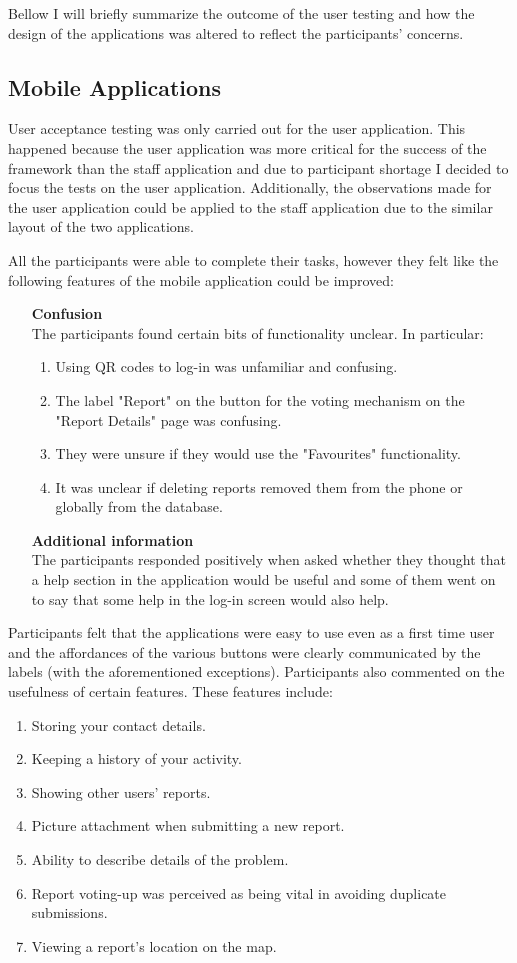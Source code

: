 \documentclass[12pt]{ecsproject}     %
\begin{document}
Bellow I will briefly summarize the outcome of the user testing and how the design of the applications was altered to reflect the participants' concerns.

\subsection{Mobile Applications}
User acceptance testing was only carried out for the user application. This happened because the user application was more critical for the success of the framework than the staff application and due to participant shortage I decided to focus the tests on the user application. Additionally, the observations made for the user application could be applied to the staff application due to the similar layout of the two applications.

All the participants were able to complete their tasks, however they felt like the following features of the mobile application could be improved:
\begin{itemize}
\item[\textbf{Confusion}] \hfill \\
The participants found certain bits of functionality unclear. In particular:
\begin{enumerate}
\item Using QR codes to log-in was unfamiliar and confusing.
\item The label "Report" on the button for the voting mechanism on the "Report Details" page was confusing.
\item They were unsure if they would use the "Favourites" functionality.
\item It was unclear if deleting reports removed them from the phone or globally from the database.
\end{enumerate}
\item[\textbf{Additional information}]\hfill \\
The participants responded positively when asked whether they thought that a help section in the application would be useful and some of them went on to say that some help in the log-in screen would also help.
\end{itemize}

Participants felt that the applications were easy to use even as a first time user and the affordances of the various buttons were clearly communicated by the labels (with the aforementioned exceptions). Participants also commented on the usefulness of certain features. These features include:
\begin{enumerate}
\item Storing your contact details.
\item Keeping a history of your activity.
\item Showing other users' reports.
\item Picture attachment when submitting a new report.
\item Ability to describe details of the problem.
\item Report voting-up was perceived as being vital in avoiding duplicate submissions.
\item Viewing a report's location on the map.
\end{enumerate}
\end{document}
